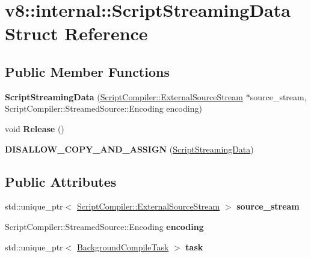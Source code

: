 \hypertarget{structv8_1_1internal_1_1ScriptStreamingData}{}\section{v8\+:\+:internal\+:\+:Script\+Streaming\+Data Struct Reference}
\label{structv8_1_1internal_1_1ScriptStreamingData}
\subsection*{Public Member Functions}
\begin{DoxyCompactItemize}
\item 
\mbox{\label{structv8_1_1internal_1_1ScriptStreamingData_a8830e9a391f941dfd689e86fe7667238}} 
{\bfseries Script\+Streaming\+Data} (\mbox{\hyperlink{classv8_1_1ScriptCompiler_1_1ExternalSourceStream}{Script\+Compiler\+::\+External\+Source\+Stream}} $\ast$source\+\_\+stream, Script\+Compiler\+::\+Streamed\+Source\+::\+Encoding encoding)
\item 
\mbox{\label{structv8_1_1internal_1_1ScriptStreamingData_ae206a94edddfd28aa309fae6f1d8601a}} 
void {\bfseries Release} ()
\item 
\mbox{\label{structv8_1_1internal_1_1ScriptStreamingData_a85cbb91c94ae27ad9929e662ad2ec670}} 
{\bfseries D\+I\+S\+A\+L\+L\+O\+W\+\_\+\+C\+O\+P\+Y\+\_\+\+A\+N\+D\+\_\+\+A\+S\+S\+I\+GN} (\mbox{\hyperlink{structv8_1_1internal_1_1ScriptStreamingData}{Script\+Streaming\+Data}})
\end{DoxyCompactItemize}
\subsection*{Public Attributes}
\begin{DoxyCompactItemize}
\item 
\mbox{\label{structv8_1_1internal_1_1ScriptStreamingData_a18ea4282e30f61282b9a95f29b4e6d0f}} 
std\+::unique\+\_\+ptr$<$ \mbox{\hyperlink{classv8_1_1ScriptCompiler_1_1ExternalSourceStream}{Script\+Compiler\+::\+External\+Source\+Stream}} $>$ {\bfseries source\+\_\+stream}
\item 
\mbox{\label{structv8_1_1internal_1_1ScriptStreamingData_a6b2dbcb862dd89e81f78e72b0db7c52e}} 
Script\+Compiler\+::\+Streamed\+Source\+::\+Encoding {\bfseries encoding}
\item 
\mbox{\label{structv8_1_1internal_1_1ScriptStreamingData_a262cd3229666c5a6391d3a3cceec95eb}} 
std\+::unique\+\_\+ptr$<$ \mbox{\hyperlink{classv8_1_1internal_1_1BackgroundCompileTask}{Background\+Compile\+Task}} $>$ {\bfseries task}
\end{DoxyCompactItemize}


